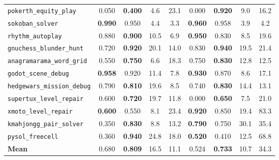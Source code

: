 \begin{table}[h]
\begin{tabular}{l cc cc | cc cc}
\texttt{pokerth\_equity\_play}  & 0.050 & \textbf{0.400} &  4.6 & 23.1 & 0.000 & \textbf{0.920} &  9.0 & 16.2 \\
\texttt{sokoban\_solver}        & \textbf{0.990} & 0.950 &  4.4 &  3.3 & \textbf{0.960} & 0.958 &  3.9 &  4.2 \\
\texttt{rhythm\_autoplay}       & 0.880 & \textbf{0.900} & 10.5 &  6.9 & \textbf{0.950} & 0.830 &  8.5 & 19.6 \\
\texttt{gnuchess\_blunder\_hunt}& 0.720 & \textbf{0.920} & 20.1 & 14.0 & 0.830 & \textbf{0.940} & 19.5 & 21.4 \\
\texttt{anagramarama\_word\_grid}& 0.550 & \textbf{0.750} &  6.6 & 18.3 & 0.750 & \textbf{0.830} & 12.8 & 12.5 \\
\texttt{godot\_scene\_debug}    & \textbf{0.958} & 0.920 & 11.4 &  7.8 & \textbf{0.930} & 0.870 &  8.6 & 17.1 \\
\texttt{hedgewars\_mission\_debug}& 0.790 & \textbf{0.810} & 19.6 &  8.5 & 0.740 & \textbf{0.830} & 14.4 & 13.1 \\
\texttt{supertux\_level\_repair}& 0.600 & \textbf{0.720} & 19.7 & 11.8 & 0.000 & \textbf{0.650} &  7.5 & 21.0 \\
\texttt{xmoto\_level\_repair}   & \textbf{0.600} & 0.550 &  8.1 & 23.4 & \textbf{0.920} & 0.850 & 19.4 & 83.3 \\
\texttt{kmahjongg\_pair\_solver}& 0.350 & \textbf{0.830} &  8.8 & 13.2 & \textbf{0.790} & 0.750 & 30.1 & 35.4 \\
\texttt{pysol\_freecell}        & 0.360 & \textbf{0.940} & 24.8 & 18.0 & \textbf{0.520} & 0.410 & 12.5 & 68.8 \\
\midrule
\textbf{Mean}                   & 0.680 & \textbf{0.809} & 16.5 & 11.1 & 0.524 & \textbf{0.733} & 10.7 & 34.3 \\
\bottomrule
\end{tabular}
\end{table}


